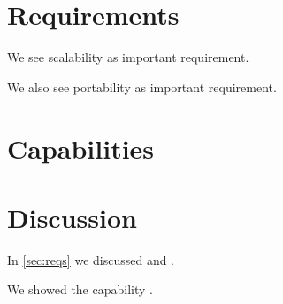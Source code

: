 \documentclass{article}
\begin{document}


\section{Requirements}
\label{sec:reqs}
We see scalability as important requirement.

We also see portability as important requirement.

\section{Capabilities}

\section{Discussion}
In \autoref{sec:reqs} we discussed  and .

We showed the capability .
\end{document}
